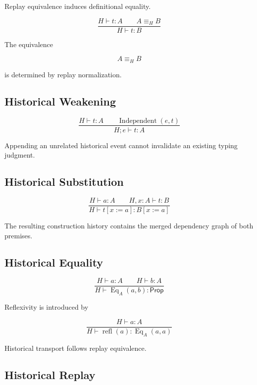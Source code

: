 \documentclass[12pt,oneside]{article}
\theoremstyle{definition}
\theoremstyle{remark}
\newcommand{\Prop}{\mathsf{Prop}}
\begin{document}
Replay equivalence induces definitional equality.

\[
\frac{
H
\vdash
t
:
A
\qquad
A
\equiv_H
B
}{
H
\vdash
t
:
B
}
\]

The equivalence

\[
A
\equiv_H
B
\]

is determined by replay normalization.


\subsection{Historical Weakening}

\[
\frac{
H
\vdash
t
:
A
\qquad
\operatorname{Independent}(e,t)
}{
H;e
\vdash
t
:
A
}
\]

Appending an unrelated historical event cannot invalidate an existing typing
judgment.


\subsection{Historical Substitution}

\[
\frac{
H
\vdash
a
:
A
\qquad
H,
x:A
\vdash
t
:
B
}{
H
\vdash
t[x:=a]
:
B[x:=a]
}
\]

The resulting construction history contains the merged dependency graph of both
premises.


\subsection{Historical Equality}

\[
\frac{
H
\vdash
a
:
A
\qquad
H
\vdash
b
:
A
}{
H
\vdash
\operatorname{Eq}_A(a,b)
:
\Prop
}
\]

Reflexivity is introduced by

\[
\frac{
H
\vdash
a
:
A
}{
H
\vdash
\operatorname{refl}(a)
:
\operatorname{Eq}_A(a,a)
}
\]

Historical transport follows replay equivalence.


\subsection{Historical Replay}
\end{document}
